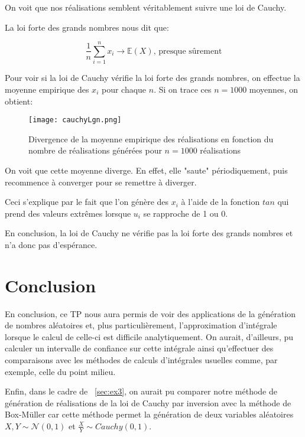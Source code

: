 \documentclass{article}
\begin{document}
\begin{multicols}{2}
On voit que nos réalisations semblent véritablement suivre une loi de Cauchy.

La loi forte des grands nombres nous dit que:

\begin{equation}
    \frac{1}{n} \sum_{i = 1}^{n} x_i \to \mathbb{E}(X) \text{, presque sûrement}
\end{equation}

Pour voir si la loi de Cauchy vérifie la loi forte des grands nombres, on
effectue la moyenne empirique des $x_i$ pour chaque $n$. Si on trace ces
$n = 1000$ moyennes, on obtient:

\begin{figure}[H]
    \begin{center}
        \texttt{[image: cauchyLgn.png]}
        \centering
        \captionsetup{justification=centering}
        \caption{\label{fig:cauchyLgn}Divergence de la moyenne empirique des réalisations en fonction du nombre de réalisations générées pour $n = 1000$ réalisations}
    \end{center}
\end{figure}

On voit que cette moyenne diverge. En effet, elle "saute" périodiquement, puis
recommence à converger pour se remettre à diverger.

Ceci s'explique par le fait que l'on génère des $x_i$ à l'aide de la fonction
$tan$ qui prend des valeurs extrêmes lorsque $u_i$ se rapproche de 1 ou 0.

En conclusion, la loi de Cauchy ne vérifie pas la loi forte des grands nombres
et n'a donc pas d'espérance.


\section{Conclusion}\label{sec:conclu}

En conclusion, ce TP nous aura permis de voir des applications de la
génération de nombres aléatoires et, plus particulièrement, l'approximation
d'intégrale lorsque le calcul de celle-ci est difficile analytiquement. On
aurait, d'ailleurs, pu calculer un intervalle de confiance sur cette intégrale
ainsi qu'effectuer des comparaisons avec les méthodes de calculs d'intégrales
usuelles comme, par exemple, celle du point milieu.

Enfin, dans le cadre de ~\ref{sec:ex3}, on aurait pu comparer notre méthode de
génération de réalisations de la loi de Cauchy par inversion avec la méthode
de Box-Müller car cette méthode permet la génération de deux variables
aléatoires $X, Y \sim \mathcal{N}(0, 1)$ et $\frac{X}{Y} \sim Cauchy(0, 1)$.


\end{multicols}
\end{document}
